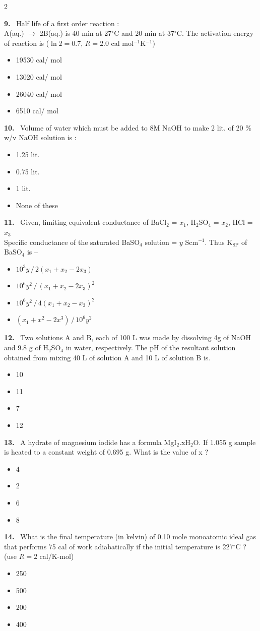 \documentclass[10pt]{extarticle}
\newcommand{\qn}[1]{\par\smallskip\noindent\textbf{#1.}~}
\newenvironment{qoptions}{\begin{itemize}[leftmargin=1.8em,itemsep=1pt,topsep=2pt,label={}]}{\end{itemize}}
\newcommand{\opt}[2]{\item[(#1)] #2}
\begin{document}
\begin{multicols}{2}
\qn{9} Half life of a first order reaction :\\
A(aq.) $\rightarrow$ 2B(aq.) is 40 min at 27$^\circ$C and 20 min at 37$^\circ$C. The activation energy of reaction is ($\ln 2 = 0.7$, $R = 2.0$ cal mol$^{-1}$K$^{-1}$)
\begin{qoptions}
\opt{A}{19530 cal/ mol}
\opt{B}{13020 cal/ mol}
\opt{C}{26040 cal/ mol}
\opt{D}{6510 cal/ mol}
\end{qoptions}

\qn{10} Volume of water which must be added to 8M NaOH to make 2 lit. of 20 \% w/v NaOH solution is :
\begin{qoptions}
\opt{A}{1.25 lit.}
\opt{B}{0.75 lit.}
\opt{C}{1 lit.}
\opt{D}{None of these}
\end{qoptions}

\qn{11} Given, limiting equivalent conductance of BaCl$_2$ = $x_1$, H$_2$SO$_4$ = $x_2$, HCl = $x_3$\\
Specific conductance of the saturated BaSO$_4$ solution = $y$ Scm$^{-1}$. Thus K$_{\mathrm{SP}}$ of BaSO$_4$ is --
\begin{qoptions}
\opt{A}{$10^3y\,/\,2(x_1+x_2-2x_3)$}
\opt{B}{$10^6y^2\,/\,(x_1+x_2-2x_3)^2$}
\opt{C}{$10^6y^2\,/\,4(x_1+x_2-x_3)^2$}
\opt{D}{$(x_1+x^2-2x^3)\,/\,10^6y^2$}
\end{qoptions}

\qn{12} Two solutions A and B, each of 100 L was made by dissolving 4g of NaOH and 9.8 g of H$_2$SO$_4$ in water, respectively. The pH of the resultant solution obtained from mixing 40 L of solution A and 10 L of solution B is\underline{\hspace{3em}}.
\begin{qoptions}
\opt{A}{10}
\opt{B}{11}
\opt{C}{7}
\opt{D}{12}
\end{qoptions}

\qn{13} A hydrate of magnesium iodide has a formula MgI$_2$.xH$_2$O. If 1.055 g sample is heated to a constant weight of 0.695 g. What is the value of x ?
\begin{qoptions}
\opt{A}{4}
\opt{B}{2}
\opt{C}{6}
\opt{D}{8}
\end{qoptions}

\qn{14} What is the final temperature (in kelvin) of 0.10 mole monoatomic ideal gas that performs 75 cal of work adiabatically if the initial temperature is 227$^\circ$C ? (use $R = 2$ cal/K-mol)
\begin{qoptions}
\opt{A}{250}
\opt{B}{500}
\opt{C}{200}
\opt{D}{400}
\end{qoptions}


\end{multicols}
\end{document}
